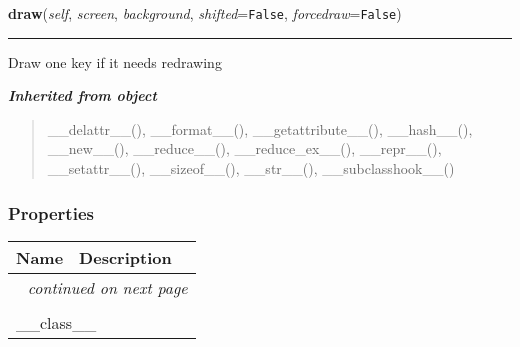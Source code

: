    \vspace{0.5ex}

\hspace{.8\funcindent}\begin{boxedminipage}{\funcwidth}

    \raggedright \textbf{draw}(\textit{self}, \textit{screen}, \textit{background}, \textit{shifted}={\tt False}, \textit{forcedraw}={\tt False})

    \vspace{-1.5ex}

    \rule{\textwidth}{0.5\fboxrule}
\setlength{\parskip}{2ex}
    Draw one key if it needs redrawing

\setlength{\parskip}{1ex}
    \end{boxedminipage}


\large{\textbf{\textit{Inherited from object}}}

\begin{quote}
\_\_delattr\_\_(), \_\_format\_\_(), \_\_getattribute\_\_(), \_\_hash\_\_(), \_\_new\_\_(), \_\_reduce\_\_(), \_\_reduce\_ex\_\_(), \_\_repr\_\_(), \_\_setattr\_\_(), \_\_sizeof\_\_(), \_\_str\_\_(), \_\_subclasshook\_\_()
\end{quote}


  \subsubsection{Properties}

    \vspace{-1cm}
\hspace{\varindent}\begin{longtable}{|p{\varnamewidth}|p{\vardescrwidth}|l}
\cline{1-2}
\cline{1-2} \centering \textbf{Name} & \centering \textbf{Description}& \\
\cline{1-2}
\endhead\cline{1-2}\multicolumn{3}{r}{\small\textit{continued on next page}}\\\endfoot\cline{1-2}
\endlastfoot\multicolumn{2}{|l|}{\textit{Inherited from object}}\\
\multicolumn{2}{|p{\varwidth}|}{\raggedright \_\_class\_\_}\\
\cline{1-2}
\end{longtable}

